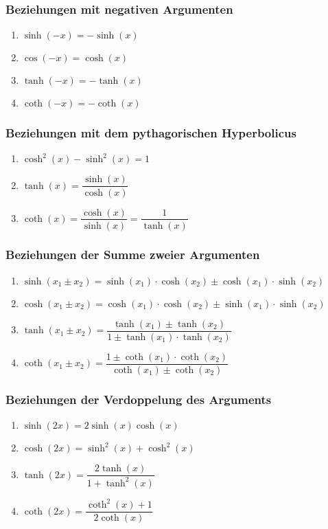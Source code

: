 \subsubsection{Beziehungen mit negativen Argumenten}
\begin{enumerate}[$(a)$]
\item $\sinh\left(-x\right)=-\sinh\left(x\right)$
\item $\cos\left(-x\right)=\cosh\left(x\right)$
\item $\tanh\left(-x\right)=-\tanh\left(x\right)$
\item $\coth\left(-x\right)=-\coth\left(x\right)$
\end{enumerate}
\subsubsection{Beziehungen mit dem pythagorischen Hyperbolicus}
\begin{enumerate}[$(a)$]
\item $\cosh^2\left(x\right)-\sinh^2\left(x\right)=1$
\item $\tanh\left(x\right)=\dfrac{\sinh\left(x\right)}{\cosh\left(x\right)}$
\item $\coth\left(x\right)=\dfrac{\cosh\left(x\right)}{\sinh\left(x\right)}=\dfrac{1}{\tanh\left(x\right)}$
\end{enumerate}
\subsubsection{Beziehungen der Summe zweier Argumenten}
\begin{enumerate}[$(a)$]
\item $\sinh\left(x_1\pm x_2\right)=\sinh\left(x_1\right)\cdot \cosh\left(x_2\right)\pm\cosh\left(x_1\right)\cdot \sinh\left(x_2\right)$
\item $\cosh\left(x_1\pm x_2\right)=\cosh\left(x_1\right)\cdot \cosh\left(x_2\right)\pm \sinh\left(x_1\right)\cdot \sinh\left(x_2\right)$
\item $\tanh\left(x_1\pm x_2\right)=\dfrac{\tanh\left(x_1\right)\pm \tanh\left(x_2\right)}{1\pm \tanh\left(x_1\right)\cdot \tanh\left(x_2\right)}$
\item $\coth\left(x_1\pm x_2\right)=\dfrac{1\pm \coth\left(x_1\right)\cdot \coth\left(x_2\right)}{\coth\left(x_1\right)\pm \coth\left(x_2\right)}$
\end{enumerate}
\subsubsection{Beziehungen der Verdoppelung des Arguments}
\begin{enumerate}[$(a)$]
\item $\sinh\left(2x\right)=2\sinh\left(x\right)\cosh\left(x\right)$
\item $\cosh\left(2x\right)=\sinh^2\left(x\right)+\cosh^2\left(x\right)$
\item $\tanh\left(2x\right)=\dfrac{2\tanh\left(x\right)}{1+\tanh^2\left(x\right)}$
\item $\coth\left(2x\right)=\dfrac{\coth^2\left(x\right)+1}{2\coth\left(x\right)}$
\end{enumerate}
